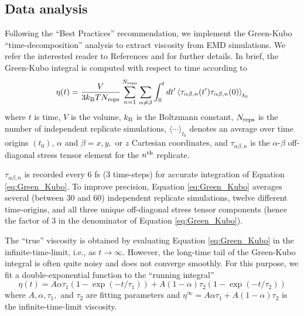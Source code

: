 \documentclass[preprint,review,12pt]{elsarticle}
\begin{document}
	\subsection{Data analysis}
	
	Following the ``Best Practices'' recommendation, we implement the Green-Kubo ``time-decomposition'' analysis to extract viscosity from EMD simulations. We refer the interested reader to References  and  for further details. In brief, the Green-Kubo integral is computed with respect to time according to
	\begin{equation} \label{eq:Green_Kubo}
	\eta(t) = \frac{V}{3 k_{\rm B} T N_{\rm reps}} \sum_{n=1}^{N_{\rm reps}} \sum_{\alpha \ne \beta} \int_{0}^{t}dt'\left\langle \tau_{\alpha\beta,n}(t') \tau_{\alpha\beta,n}(0)\right\rangle_{t_0}
	\end{equation} 
	where $t$ is time, $V$ is the volume, $k_{\rm B}$ is the Boltzmann constant, $N_{\rm reps}$ is the number of independent replicate simulations, $\langle \cdots \rangle_{t_0}$ denotes an average over time origins $(t_0)$, $\alpha$ and $\beta = x, y, $ or $z$ Cartesian coordinates, and $\tau_{\alpha\beta,n}$ is the $\alpha$-$\beta$ off-diagonal stress tensor element for the $n^{\rm th}$ replicate. 
	
	$\tau_{\alpha\beta,n}$ is recorded every 6 fs (3 time-steps) for accurate integration of Equation \ref{eq:Green_Kubo}. To improve precision, Equation \ref{eq:Green_Kubo} averages several (between 30 and 60) independent replicate simulations, twelve different time-origins, and all three unique off-diagonal stress tensor components (hence the factor of 3 in the denominator of Equation \ref{eq:Green_Kubo}).
	
	
	The ``true'' viscosity is obtained by evaluating Equation \ref{eq:Green_Kubo} in the infinite-time-limit, i.e., as $t \rightarrow \infty$. However, the long-time tail of the Green-Kubo integral is often quite noisy and does not converge smoothly. For this purpose, we fit a double-exponential function to the ``running integral''
	\begin{equation} \label{eq: Double exponential}
	\eta(t) = A \alpha \tau_1 \left(1-\exp{(-t/\tau_1)}\right) + A (1-\alpha) \tau_2 \left(1-\exp{(-t/\tau_2)}\right)
	\end{equation}
	where $A, \alpha, \tau_1, $ and $\tau_2$ are fitting parameters and $\eta^\infty = A \alpha \tau_1 + A (1-\alpha) \tau_2$ is the infinite-time-limit viscosity. 
	
\end{document}
